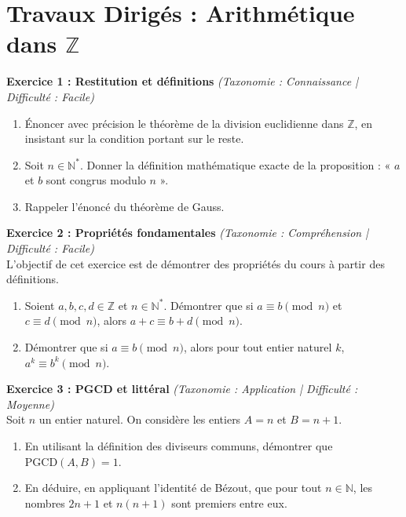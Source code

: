 \section*{Travaux Dirigés : Arithmétique dans $\mathbb{Z}$}

\vspace{0.5cm}

\noindent\textbf{Exercice 1 : Restitution et définitions} \textit{(Taxonomie : Connaissance | Difficulté : Facile)}
\begin{enumerate}
    \item Énoncer avec précision le théorème de la division euclidienne dans $\mathbb{Z}$, en insistant sur la condition portant sur le reste.
    \item Soit $n \in \mathbb{N}^*$. Donner la définition mathématique exacte de la proposition : « $a$ et $b$ sont congrus modulo $n$ ».
    \item Rappeler l'énoncé du théorème de Gauss.
\end{enumerate}

\vspace{0.5cm}

\noindent\textbf{Exercice 2 : Propriétés fondamentales} \textit{(Taxonomie : Compréhension | Difficulté : Facile)} \\
L'objectif de cet exercice est de démontrer des propriétés du cours à partir des définitions.
\begin{enumerate}
    \item Soient $a, b, c, d \in \mathbb{Z}$ et $n \in \mathbb{N}^*$. Démontrer que si $a \equiv b \pmod{n}$ et $c \equiv d \pmod{n}$, alors $a + c \equiv b + d \pmod{n}$.
    \item Démontrer que si $a \equiv b \pmod{n}$, alors pour tout entier naturel $k$, $a^k \equiv b^k \pmod{n}$.
\end{enumerate}

\vspace{0.5cm}

\noindent\textbf{Exercice 3 : PGCD et littéral} \textit{(Taxonomie : Application | Difficulté : Moyenne)} \\
Soit $n$ un entier naturel. On considère les entiers $A = n$ et $B = n+1$.
\begin{enumerate}
    \item En utilisant la définition des diviseurs communs, démontrer que $\text{PGCD}(A, B) = 1$.
    \item En déduire, en appliquant l'identité de Bézout, que pour tout $n \in \mathbb{N}$, les nombres $2n+1$ et $n(n+1)$ sont premiers entre eux.
\end{enumerate}

